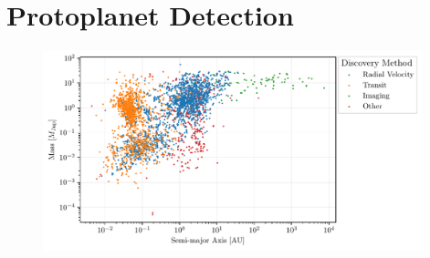 \section{Protoplanet Detection}



\begin{figure}[H]
    \centering
    \includegraphics[width = 0.98\textwidth]{figures/exoplanet.pdf}
    \caption{}
    \label{fig:exoplanets}
\end{figure}

